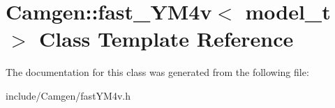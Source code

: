 \hypertarget{a00220}{}\section{Camgen\+:\+:fast\+\_\+\+Y\+M4v$<$ model\+\_\+t $>$ Class Template Reference}
\label{a00220}


The documentation for this class was generated from the following file\+:\begin{DoxyCompactItemize}
\item 
include/\+Camgen/fast\+Y\+M4v.\+h\end{DoxyCompactItemize}
